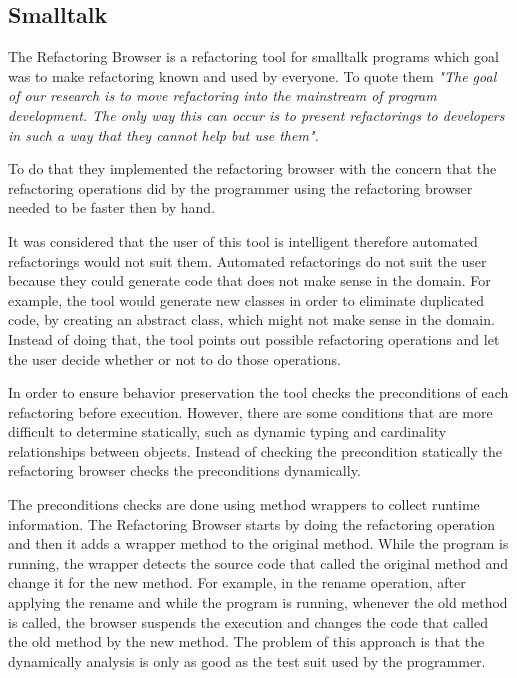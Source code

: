 





\subsection{Smalltalk}%

The Refactoring Browser \cite{roberts1997refactoring} is a refactoring tool for smalltalk programs which goal was to make refactoring known and used by everyone.
To quote them  \textit{"The goal of our research is to move refactoring into the mainstream of program development. The only way this can occur is to present refactorings to developers in such a way that they cannot help but use them".} 

To do that they implemented the refactoring browser with the concern that the refactoring operations did by the programmer using the refactoring browser needed to be faster then by hand.

It was considered that the user of this tool is intelligent therefore automated refactorings would not suit them. 
Automated refactorings do not suit the user because they could generate code that does not make sense in the domain.
For example, the tool would generate new classes in order to eliminate duplicated code, by creating an abstract class, which might not make sense in the domain. Instead of doing that, the tool points out possible refactoring operations and let the user decide whether or not to do those operations.

In order to ensure behavior preservation the tool checks the preconditions of each refactoring before execution. 
However, there are some conditions that are more difficult to determine statically, such as dynamic typing and cardinality relationships between objects. 
Instead of checking the precondition statically the refactoring browser checks the preconditions dynamically. 

The preconditions checks are done using method wrappers to collect runtime information. 
The Refactoring Browser starts by doing the refactoring operation and then it adds a wrapper method to the original method. 
While the program is running, the wrapper detects the source code that called the original method and change it for the new method.
For example, in the rename operation, after applying the rename and while the program is running, whenever the old method is called, the browser suspends the execution and changes the code that called the old method by the new method. 
The problem of this approach is that the dynamically analysis is only as good as the test suit used by the programmer.


